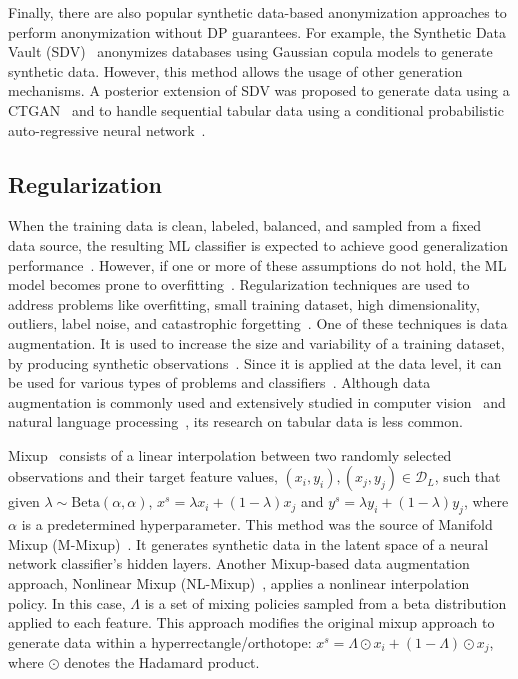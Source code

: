 Finally, there are also popular synthetic data-based anonymization approaches to
perform anonymization without DP guarantees. For example, the Synthetic Data
Vault (SDV)~\cite{patki2016synthetic} anonymizes databases using Gaussian
copula models to generate synthetic data. However, this method allows the
usage of other generation mechanisms. A posterior extension of SDV was
proposed to generate data using a CTGAN~\cite{xu2019modeling} and to handle
sequential tabular data using a conditional probabilistic auto-regressive
neural network~\cite{zhang2022sequential}. 


\subsection{Regularization}\label{sec:regularization}

When the training data is clean, labeled, balanced, and sampled from a fixed
data source, the resulting ML classifier is expected to achieve good
generalization performance~\cite{benning2018modern}. However, if one or more
of these assumptions do not hold, the ML model becomes prone to
overfitting~\cite{Bartlett2021}. Regularization techniques are used to
address problems like overfitting, small training dataset, high
dimensionality, outliers, label noise, and catastrophic
forgetting~\cite{Halevy2009, Domingos2012, Salman2019, Xie2021}. One of
these techniques is data augmentation.
It is used to increase the size and variability of a training dataset, by
producing synthetic observations~\cite{Van2001, Wong2016}. Since it is applied
at the data level, it can be used for various types of problems and
classifiers~\cite{Behpour2019}. Although data
augmentation is commonly used and extensively studied in computer
vision~\cite{shorten2019survey} and natural language
processing~\cite{feng2021survey}, its research on tabular data is less common.

Mixup~\cite{zhang2018mixup} consists of a linear interpolation between two
randomly selected observations and their target feature values, $(x_i, y_i),
(x_j, y_j) \in \mathcal{D}_L$, such that given $\lambda \sim
\text{Beta}(\alpha,\alpha)$, $x^s = \lambda x_i + (1-\lambda) x_j$ and $y^s =
\lambda y_i + (1-\lambda) y_j$, where $\alpha$ is a predetermined
hyperparameter. This method was the source of Manifold Mixup
(M-Mixup)~\cite{verma2019manifold}. It generates synthetic data in the latent
space of a neural network classifier's hidden layers. Another Mixup-based
data augmentation approach, Nonlinear Mixup
(NL-Mixup)~\cite{guo2020nonlinear}, applies a nonlinear interpolation policy.
In this case, $\Lambda$ is a set of mixing policies sampled from a beta
distribution applied to each feature. This approach modifies the original
mixup approach to generate data within a hyperrectangle/orthotope: $x^s =
\Lambda \odot x_i + (1-\Lambda) \odot x_j$, where $\odot$ denotes the Hadamard
product.

